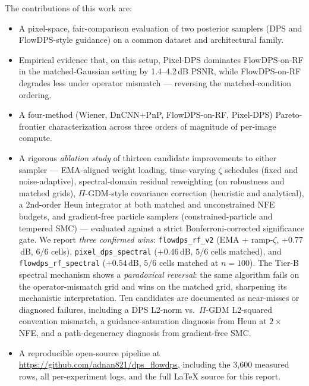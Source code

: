 \documentclass{article}
\begin{document}
The contributions of this work are:
\begin{itemize}[leftmargin=*,itemsep=2pt]
  \item A pixel-space, fair-comparison evaluation of two posterior
    samplers (DPS and FlowDPS-style guidance) on a common dataset and
    architectural family.
  \item Empirical evidence that, on this setup, Pixel-DPS dominates
    FlowDPS-on-RF in the matched-Gaussian setting by 1.4--4.2\,dB PSNR,
    while FlowDPS-on-RF degrades less under operator mismatch ---
    reversing the matched-condition ordering.
  \item A four-method (Wiener, DnCNN$+$PnP, FlowDPS-on-RF, Pixel-DPS)
    Pareto-frontier characterization across three orders of magnitude
    of per-image compute.
  \item A rigorous \emph{ablation study} of thirteen candidate
    improvements to either sampler --- EMA-aligned weight loading,
    time-varying $\zeta$ schedules (fixed and noise-adaptive),
    spectral-domain residual reweighting (on robustness and matched
    grids), $\Pi$-GDM-style covariance correction (heuristic and
    analytical), a 2nd-order Heun integrator at both matched and
    unconstrained NFE budgets, and gradient-free particle samplers
    (constrained-particle and tempered SMC) --- evaluated against a
    strict Bonferroni-corrected significance gate. We report
    \emph{three confirmed wins}: \texttt{flowdps\_rf\_v2}
    (EMA $+$ ramp-$\zeta$, $+0.77$\,dB, $6/6$ cells),
    \texttt{pixel\_dps\_spectral} ($+0.46$\,dB, $5/6$ cells matched),
    and \texttt{flowdps\_rf\_spectral} ($+0.54$\,dB, $5/6$ cells
    matched at $n{=}100$). The Tier-B spectral mechanism shows a
    \emph{paradoxical reversal}: the same algorithm fails on the
    operator-mismatch grid and wins on the matched grid, sharpening
    its mechanistic interpretation. Ten candidates are documented as
    near-misses or diagnosed failures, including a DPS L2-norm vs.\
    $\Pi$-GDM L2-squared convention mismatch, a guidance-saturation
    diagnosis from Heun at $2{\times}$ NFE, and a path-degeneracy
    diagnosis from gradient-free SMC.
  \item A reproducible open-source pipeline at
    \url{https://github.com/adnan821/dps_flowdps}, including the 3{,}600
    measured rows, all per-experiment logs, and the full LaTeX source
    for this report.
\end{itemize}

\end{document}
